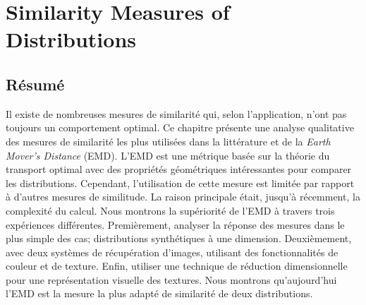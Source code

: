 
\chapter{Similarity Measures of Distributions}\label{ch:similarity_measures}


\section*{Résumé}
\noindent Il existe de nombreuses mesures de similarité qui, selon l'application, n'ont pas toujours un comportement optimal. Ce chapitre présente une analyse qualitative des mesures de similarité les plus utilisées dans la littérature et de la \textit{Earth Mover's Distance} (EMD). L'EMD est une métrique basée sur la théorie du transport optimal avec des propriétés géométriques intéressantes pour comparer les distributions. Cependant, l'utilisation de cette mesure est limitée par rapport à d'autres mesures de similitude. La raison principale était, jusqu'à récemment, la complexité du calcul. Nous montrons la supériorité de l'EMD à travers trois expériences différentes. Premièrement, analyser la réponse des mesures dans le plus simple des cas; distributions synthétiques à une dimension. Deuxièmement, avec deux systèmes de récupération d'images, utilisant des fonctionnalités de couleur et de texture. Enfin, utiliser une technique de réduction dimensionnelle pour une représentation visuelle des textures. Nous montrons qu'aujourd'hui l'EMD est la mesure la plus adapté de similarité de deux distributions.

